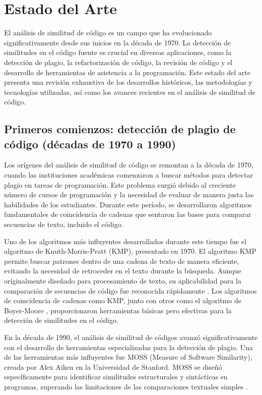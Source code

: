 \chapter{Estado del Arte}\label{chapter:state-of-the-art}
El análisis de similitud de código es un campo que ha evolucionado significativamente desde sus inicios en la década de 1970. La detección de similitudes en el código fuente es crucial en diversas aplicaciones, como la detección de plagio, la refactorización de código, la revisión de código y el desarrollo de herramientas de asistencia a la programación. Este estado del arte presenta una revisión exhaustiva de los desarrollos históricos, las metodologías y tecnologías utilizadas, así como los avances recientes en el análisis de similitud de código.

\section*{\textbf{Primeros comienzos: detección de plagio de código (décadas de 1970 a 1990)}}  
Los orígenes del análisis de similitud de código se remontan a la década de 1970, cuando las instituciones académicas comenzaron a buscar métodos para detectar plagio en tareas de programación. Este problema surgió debido al creciente número de cursos de programación y la necesidad de evaluar de manera justa las habilidades de los estudiantes. Durante este período, se desarrollaron algoritmos fundamentales de coincidencia de cadenas que sentaron las bases para comparar secuencias de texto, incluido el código.

Uno de los algoritmos más influyentes desarrollados durante este tiempo fue el algoritmo de Knuth-Morris-Pratt (KMP), presentado en 1970. El algoritmo KMP permite buscar patrones dentro de una cadena de texto de manera eficiente, evitando la necesidad de retroceder en el texto durante la búsqueda. Aunque originalmente diseñado para procesamiento de texto, su aplicabilidad para la comparación de secuencias de código fue reconocida rápidamente \cite{knuth1977fast}. Los algoritmos de coincidencia de cadenas como KMP, junto con otros como el algoritmo de Boyer-Moore \cite{boyer1977fast}, proporcionaron herramientas básicas pero efectivas para la detección de similitudes en el código.

En la década de 1990, el análisis de similitud de códigos avanzó significativamente con el desarrollo de herramientas especializadas para la detección de plagio. Una de las herramientas más influyentes fue MOSS (Measure of Software Similarity), creada por Alex Aiken en la Universidad de Stanford. MOSS se diseñó específicamente para identificar similitudes estructurales y sintácticas en programas, superando las limitaciones de las comparaciones textuales simples \cite{aiken1994moss}.


